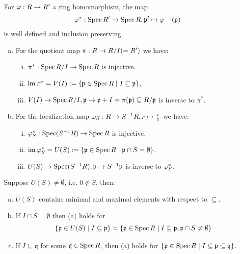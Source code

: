 \documentclass[a4paper]{report}
\begin{document}
\begin{prop}
  For $\varphi: R \to R'$ a ring homomorphism, the map \[\varphi^{*} : \operatorname{Spec} R' \to \operatorname{Spec} R, \mathfrak p' \mapsto \varphi^{-1}(\mathfrak p) \]
  is well defined and inclusion preserving.
\end{prop}

\begin{prop}
\begin{enumerate}[(a)]
  \item For the quotient map $\pi: R \to \fak RI(=R')$ we have:
        \begin{enumerate}[(i)]
          \item $\pi^{*}: \Spec \fak RI \to \Spec R$ is injective.
          \item $\operatorname{im} \pi^{*} = V(I) := \{\mathfrak p \in \operatorname{Spec} R \mid I \subseteq \mathfrak p\}$.
          \item $V(I) \to \Spec \fak RI, \mathfrak p \mps \mathfrak p + I = \pi(\mathfrak p) \subseteq \fak R{\mathfrak p}$ is inverse to $\pi^{*}$.
        \end{enumerate}
  \item For the localization map $\varphi_{S}: R \to S^{-1}R, r \mapsto \frac r1$ we have:
        \begin{enumerate}[(i)]
          \item $\varphi_{S}^{*}: \operatorname{Spec} (S^{-1}R) \to \operatorname{Spec} R$ is injective.
          \item $\operatorname{im} \varphi_{S}^{*} = U(S) := \{\mathfrak p \in \operatorname{Spec} R \mid \mathfrak p \cap S = \emptyset\}$.
          \item $U(S) \to\operatorname{Spec} (S^{-1}R), \mathfrak p \mapsto S^{-1}\mathfrak p$ is inverse to $\varphi_{S}^{*}$.
        \end{enumerate}
\end{enumerate}
\end{prop}

\begin{cor}[to Theorem 10]
  Suppose $U(S) \ne \emptyset$, i.e. $0 \notin S$, then:
  \begin{enumerate}[(a)]
    \item $U(S)$ contains minimal and maximal elements with respect to $\subseteq$.
    \item If $I \cap S = \emptyset$ then (a) holds for \[\{\mathfrak p \in U(S) \mid I \subseteq \mathfrak p\} = \{\mathfrak p \in \operatorname{Spec} R \mid I \subseteq \mathfrak p, \mathfrak p \cap S \ne \emptyset\}\]
          \item If $I \subseteq \mathfrak q$ for some $\mathfrak q \in \operatorname{Spec} R$, then (a) holds for $\{\mathfrak p \in \operatorname{Spec} R \mid I \subseteq \mathfrak p \subseteq \mathfrak q\}$.
  \end{enumerate}
\end{cor}
\end{document}

